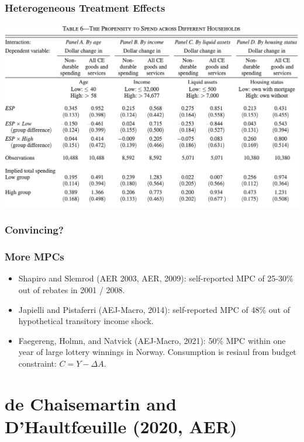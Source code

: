 \documentclass[english,xcolor=svgnames]{beamer}
\begin{document}
\begin{frame}
\frametitle[alignment=center]{Heterogeneous Treatment Effects}
\centering
\includegraphics[scale=0.6]{figures/PSMJTAB6.png}
\end{frame}


\begin{frame}
\frametitle[alignment=center]{Convincing?}

\end{frame}

\begin{frame}
\frametitle[alignment=center]{More MPCs}
\begin{itemize}
	\item Shapiro and Slemrod (AER 2003, AER, 2009): self-reported MPC of 25-30\% out of rebates in 2001 / 2008.
	\item Japielli and Pistaferri (AEJ-Macro, 2014): self-reported MPC of 48\% out of hypothetical transitory income shock.
	\item Faegereng, Holmn, and Natvick (AEJ-Macro, 2021): 50\% MPC within one year of large lottery winnings in Norway. Consumption is resiaul from budget constraint: $C=Y - \Delta A$.
\end{itemize}
\end{frame}


\section{de Chaisemartin and D'Haultf{\oe}uille (2020, AER)}
\end{document}
